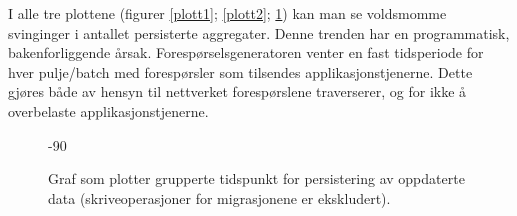 I alle tre plottene (figurer \ref{plott1}; \ref{plott2}; \ref{plott3}) kan man se voldsmomme svinginger i antallet persisterte aggregater. Denne trenden har en programmatisk, bakenforliggende årsak. Forespørselsgeneratoren venter en fast tidsperiode for hver pulje/batch med forespørsler som tilsendes applikasjonstjenerne. Dette gjøres både av hensyn til nettverket forespørslene traverserer, og for ikke å overbelaste applikasjonstjenerne.

\begin{figure}[hbtp]
  \begin{turn}{-90}
    
  \end{turn}{-90}
  \caption{Graf som plotter grupperte tidspunkt for persistering av oppdaterte data (skriveoperasjoner for migrasjonene er ekskludert).}
  \label{plott3}
\end{figure}

